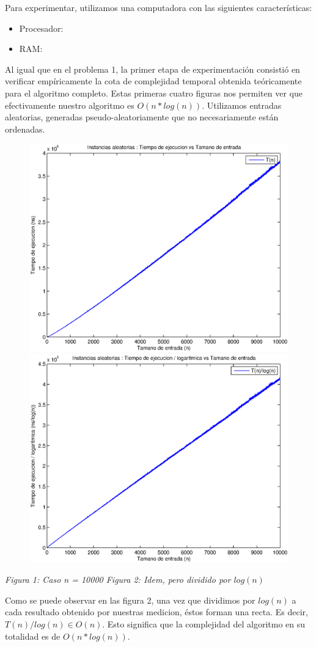 Para experimentar, utilizamos una computadora con las siguientes características:

\begin{itemize}
 \item Procesador: 
 \item RAM: 
\end{itemize}

Al igual que en el problema 1, la primer etapa de experimentación consistió en verificar empíricamente la cota de complejidad temporal obtenida teóricamente para el algoritmo completo. Estas primeras cuatro figuras nos permiten ver que efectivamente nuestro algoritmo es $O(n * log(n))$. Utilizamos entradas aleatorias, generadas pseudo-aleatoriamente que no necesariamente están ordenadas.

\begin{figure}[H]
    \includegraphics[width=0.5\linewidth]{problema2/graficos/problema2_aleatoria_10000.eps}
    \includegraphics[width=0.5\linewidth]{problema2/graficos/problema2_aleatoria_10000_div_logn.eps}
\end{figure}
\emph{\hspace{2,5cm}Figura 1: Caso n = 10000 \hspace{2,5cm}Figura 2: Idem, pero dividido por $log(n)$}

Como se puede observar en las figura 2, una vez que dividimos por $log(n)$ a cada resultado obtenido por nuestras medicion, éstos forman una recta. Es decir, $T(n)/log(n) \in O(n)$. Esto significa que la complejidad del algoritmo en su totalidad es de $O(n * log(n))$.
  
